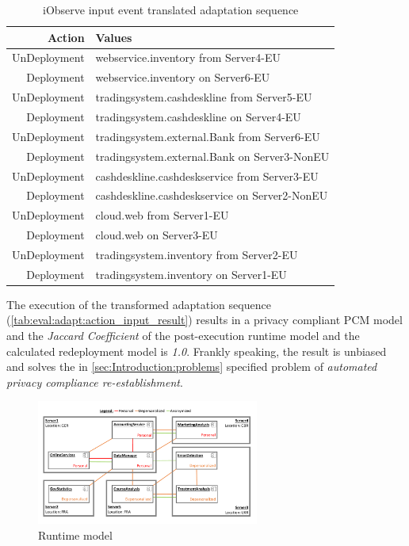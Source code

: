 \begin{table}[h]
	\centering
	\begin{tabular}{r | l}
		\hline
		\textbf{Action} & \textbf{Values}\\
		\hline
		UnDeployment & webservice.inventory from Server4-EU\\
		Deployment & webservice.inventory on Server6-EU\\
		
		UnDeployment & tradingsystem.cashdeskline from Server5-EU\\
		Deployment & tradingsystem.cashdeskline on Server4-EU\\
		
		UnDeployment & tradingsystem.external.Bank from Server6-EU\\
		Deployment & tradingsystem.external.Bank on Server3-NonEU\\
		
		UnDeployment & cashdeskline.cashdeskservice from Server3-EU\\
		Deployment & cashdeskline.cashdeskservice on Server2-NonEU\\
		
		UnDeployment & cloud.web from Server1-EU\\
		Deployment & cloud.web on Server3-EU\\
		
		UnDeployment & tradingsystem.inventory from Server2-EU\\
		Deployment & tradingsystem.inventory on Server1-EU\\
		\hline
	\end{tabular}
	\caption{iObserve input event translated adaptation sequence}
	\label{tab:eval:adapt:action_input_result}
\end{table}


The execution of the transformed adaptation sequence (\autoref{tab:eval:adapt:action_input_result}) results in a privacy compliant PCM model and the \textit{Jaccard Coefficient} of the post-execution runtime model and the calculated redeployment model is \textit{1.0}. Frankly speaking, the result is unbiased and solves the in \autoref{sec:Introduction:problems} specified problem of \textit{automated privacy compliance re-establishment}.

\begin{figure}[h]
	\centering
	\includegraphics[trim = 5mm 10mm 10mm 10mm, clip, width=0.65\textwidth]{graphs/medSystem_adap_calc_all_runtime}
	\caption{Runtime model}
	\label{fig:eval:adapt:4:run}
\end{figure}


